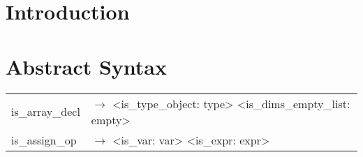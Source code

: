 \documentclass[a4paper]{article}
\title{\documentTitle}
\author{\documentAuthors{}}
\begin{document}
\renewcommand{\figurename}{Figure}
\maketitle
\cleardoublepage

\tableofcontents
\cleardoublepage

\setlength{\parindent}{1cm}
\setlength{\parskip}{0.3cm}

\section{Introduction}
\section{Abstract Syntax}
\begin{tabular}{ll}
	is\_array\_decl & $\to$ <is\_type\_object: type> <is\_dims\_empty\_list: empty> \\
	is\_assign\_op  & $\to$ <is\_var: var> <is\_expr: expr> \\
\end{tabular}
\end{document}
